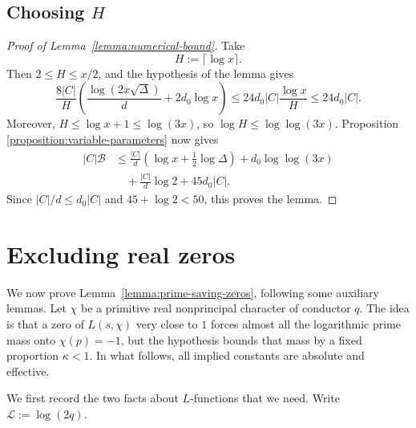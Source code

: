 \documentclass[reqno]{amsart} 
\begin{document}
\subsection{Choosing $H$}\label{sec:cus71nhw6n}

\begin{proof}[Proof of Lemma~\ref{lemma:numerical-bound}]
  Take
  \begin{equation*}
    H := \lceil\log x\rceil.
  \end{equation*}
  Then $2 \leq H \leq x/2$, and the hypothesis of the lemma gives
  \begin{equation*}
    \frac{8|C|}{H}\left(\frac{\log(2x\sqrt{\Delta})}{d} + 2d_0\log x\right)
    \leq 24d_0|C|\frac{\log x}{H}
    \leq 24d_0|C|.
  \end{equation*}
  Moreover, $H \leq \log x + 1 \leq \log(3x)$, so $\log H \leq \log\log(3x)$.  Proposition \ref{proposition:variable-parameters} now gives
  \begin{equation*}
    \begin{split}
      |C|\mathcal{B}
      &\leq \frac{|C|}{d}\left(\log x + \frac12\log\Delta\right)
        + d_0\log\log(3x) \\
      &\quad + \frac{|C|}{d}\log 2 + 45d_0|C|.
    \end{split}
  \end{equation*}
  Since $|C|/d \leq d_0|C|$ and $45 + \log 2 < 50$, this proves the lemma.
\end{proof}

\section{Excluding real zeros}\label{sec:cus645mtdu}

We now prove Lemma~\ref{lemma:prime-saving-zeros}, following some auxiliary lemmas.  Let $\chi$ be a primitive real nonprincipal character of conductor $q$.  The idea is that a zero of $L(s, \chi)$ very close to $1$ forces almost all the logarithmic prime mass onto $\chi(p)=-1$, but the hypothesis bounds that mass by a fixed proportion $\kappa<1$.  In what follows, all implied constants are absolute and effective.

We first record the two facts about $L$-functions that we need.  Write $\mathcal L:=\log(2q)$.
\end{document}
